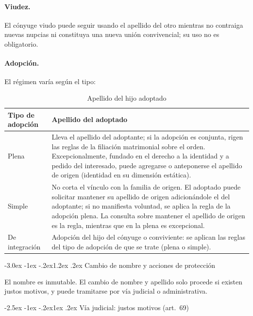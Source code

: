 \documentclass[12pt,oneside]{book}
\makeatletter
\renewcommand\section{\@startsection{section}{1}{\z@}%
  {-3.0ex \@plus -1ex \@minus -.2ex}{1.2ex \@plus .2ex}%
  {\normalfont\large\bfseries\color{acento}}}
\renewcommand\subsection{\@startsection{subsection}{2}{\z@}%
  {-2.5ex \@plus -1ex \@minus -.2ex}{1ex \@plus .2ex}%
  {\normalfont\normalsize\bfseries}}
\makeatother
\begin{document}
\paragraph{Viudez.} El cónyuge viudo puede seguir usando el apellido del otro mientras no contraiga nuevas nupcias ni constituya una nueva unión convivencial; su uso no es obligatorio.

\paragraph{Adopción.} El régimen varía según el tipo:

\begin{table}[H]
\centering
\begin{tabularx}{\textwidth}{B{0.22\textwidth} Y}
\toprule
\textbf{Tipo de adopción} & \textbf{Apellido del adoptado} \\
\midrule
Plena & Lleva el apellido del adoptante; si la adopción es conjunta, rigen las reglas de la filiación matrimonial sobre el orden. Excepcionalmente, fundado en el derecho a la identidad y a pedido del interesado, puede agregarse o anteponerse el apellido de origen (identidad en su dimensión estática). \\
Simple & No corta el vínculo con la familia de origen. El adoptado puede solicitar mantener su apellido de origen adicionándole el del adoptante; si no manifiesta voluntad, se aplica la regla de la adopción plena. La consulta sobre mantener el apellido de origen es la regla, mientras que en la plena es excepcional. \\
De integración & Adopción del hijo del cónyuge o conviviente: se aplican las reglas del tipo de adopción de que se trate (plena o simple). \\
\bottomrule
\end{tabularx}
\caption{Apellido del hijo adoptado}
\end{table}

\section{Cambio de nombre y acciones de protección}

\begin{importante}
El nombre es inmutable. El cambio de nombre y apellido solo procede si existen justos motivos, y puede tramitarse por vía judicial o administrativa.
\end{importante}

\subsection{Vía judicial: justos motivos (art.~69)}
\end{document}
